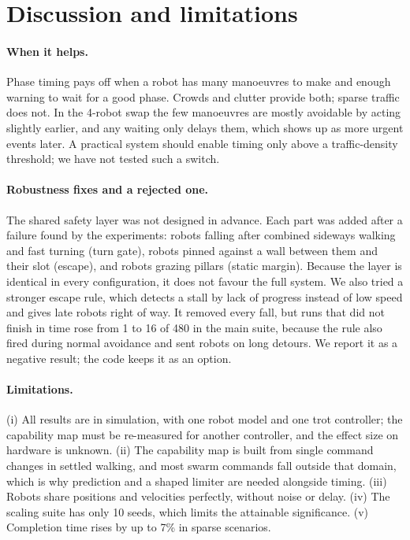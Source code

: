 \section{Discussion and limitations}\label{sec:discussion}

\paragraph{When it helps.} Phase timing pays off when a robot has many manoeuvres to make and enough warning to
wait for a good phase. Crowds and clutter provide both; sparse traffic does not. In the 4-robot swap the few
manoeuvres are mostly avoidable by acting slightly earlier, and any waiting only delays them, which shows up as
more urgent events later. A practical system should enable timing only above a traffic-density threshold; we
have not tested such a switch.

\paragraph{Robustness fixes and a rejected one.} The shared safety layer was not designed in advance. Each part
was added after a failure found by the experiments: robots falling after combined sideways walking and fast
turning (turn gate), robots pinned against a wall between them and their slot (escape), and robots grazing
pillars (static margin). Because the layer is identical in every configuration, it does not favour the full
system. We also tried a stronger escape rule, which detects a stall by lack of progress instead of low speed
and gives late robots right of way. It removed every fall, but runs that did not finish in time rose from 1 to
16 of 480 in the main suite, because the rule also fired during normal avoidance and sent robots on long
detours. We report it as a negative result; the code keeps it as an option.

\paragraph{Limitations.} (i) All results are in simulation, with one robot model and one trot controller; the
capability map must be re-measured for another controller, and the effect size on hardware is unknown.
(ii) The capability map is built from single command changes in settled walking, and most swarm commands fall
outside that domain, which is why prediction and a shaped limiter are needed alongside timing. (iii) Robots
share positions and velocities perfectly, without noise or delay. (iv) The scaling suite has only 10 seeds,
which limits the attainable significance. (v) Completion time rises by up to 7\% in sparse scenarios.

